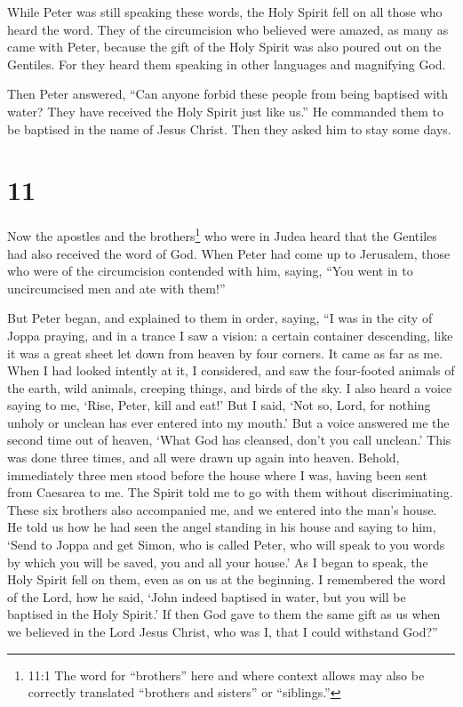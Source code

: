  While Peter was still speaking these words, the Holy
Spirit fell on all those who heard the word.  They of the
circumcision who believed were amazed, as many as came with Peter,
because the gift of the Holy Spirit was also poured out on the Gentiles.
 For they heard them speaking in other languages and
magnifying God.

Then Peter answered,  ``Can anyone forbid these people from
being baptised with water? They have received the Holy Spirit just like
us.''  He commanded them to be baptised in the name of
Jesus Christ. Then they asked him to stay some days.

\hypertarget{section-10}{%
\section{11}\label{section-10}}

 Now the apostles and the brothers\footnote{11:1 The word
  for ``brothers'' here and where context allows may also be correctly
  translated ``brothers and sisters'' or ``siblings.''} who were in
Judea heard that the Gentiles had also received the word of God.
 When Peter had come up to Jerusalem, those who were of the
circumcision contended with him,  saying, ``You went in to
uncircumcised men and ate with them!''

 But Peter began, and explained to them in order, saying,
 ``I was in the city of Joppa praying, and in a trance I saw
a vision: a certain container descending, like it was a great sheet let
down from heaven by four corners. It came as far as me. 
When I had looked intently at it, I considered, and saw the four-footed
animals of the earth, wild animals, creeping things, and birds of the
sky.  I also heard a voice saying to me, `Rise, Peter, kill
and eat!'  But I said, `Not so, Lord, for nothing unholy or
unclean has ever entered into my mouth.'  But a voice
answered me the second time out of heaven, `What God has cleansed, don't
you call unclean.'  This was done three times, and all were
drawn up again into heaven.  Behold, immediately three men
stood before the house where I was, having been sent from Caesarea to
me.  The Spirit told me to go with them without
discriminating. These six brothers also accompanied me, and we entered
into the man's house.  He told us how he had seen the angel
standing in his house and saying to him, `Send to Joppa and get Simon,
who is called Peter,  who will speak to you words by which
you will be saved, you and all your house.'  As I began to
speak, the Holy Spirit fell on them, even as on us at the beginning.
 I remembered the word of the Lord, how he said, `John
indeed baptised in water, but you will be baptised in the Holy Spirit.'
 If then God gave to them the same gift as us when we
believed in the Lord Jesus Christ, who was I, that I could withstand
God?''

